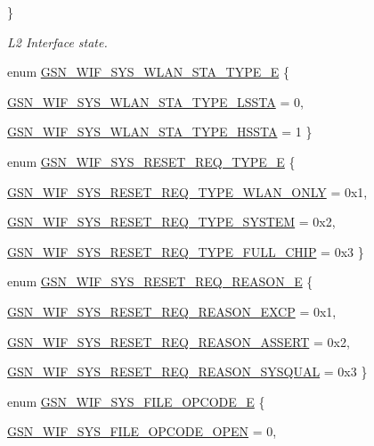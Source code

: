 \begin{DoxyCompactItemize}
 \}
\begin{DoxyCompactList}\small\item\em L2 Interface state. \end{DoxyCompactList}\item 
enum \hyperlink{a00612_a130509bc0cea8325a8be3adb5d7f4bd8}{GSN\_\-WIF\_\-SYS\_\-WLAN\_\-STA\_\-TYPE\_\-E} \{ \par
\hyperlink{a00612_a130509bc0cea8325a8be3adb5d7f4bd8a5f57577583e62def7a5a70dc0edcb87a}{GSN\_\-WIF\_\-SYS\_\-WLAN\_\-STA\_\-TYPE\_\-LSSTA} =  0, 
\par
\hyperlink{a00612_a130509bc0cea8325a8be3adb5d7f4bd8a79509557fc53ad3a04a7294c6457073d}{GSN\_\-WIF\_\-SYS\_\-WLAN\_\-STA\_\-TYPE\_\-HSSTA} =  1
 \}
\item 
enum \hyperlink{a00612_a6412fcc10baf67871043051f04fb42d4}{GSN\_\-WIF\_\-SYS\_\-RESET\_\-REQ\_\-TYPE\_\-E} \{ \par
\hyperlink{a00612_a6412fcc10baf67871043051f04fb42d4aa14896d2f4ebe90e88f8965a0daf7378}{GSN\_\-WIF\_\-SYS\_\-RESET\_\-REQ\_\-TYPE\_\-WLAN\_\-ONLY} =  0x1, 
\par
\hyperlink{a00612_a6412fcc10baf67871043051f04fb42d4af045511de8b76a204570370ec0b0f606}{GSN\_\-WIF\_\-SYS\_\-RESET\_\-REQ\_\-TYPE\_\-SYSTEM} =  0x2, 
\par
\hyperlink{a00612_a6412fcc10baf67871043051f04fb42d4abd8b477460780125b6e3596a2cf2762c}{GSN\_\-WIF\_\-SYS\_\-RESET\_\-REQ\_\-TYPE\_\-FULL\_\-CHIP} =  0x3
 \}
\item 
enum \hyperlink{a00612_aba0b2b7ee12a62ff72fa5ffa83622746}{GSN\_\-WIF\_\-SYS\_\-RESET\_\-REQ\_\-REASON\_\-E} \{ \par
\hyperlink{a00612_aba0b2b7ee12a62ff72fa5ffa83622746ac6a4355cb4d81cc01299fcbd5a23c107}{GSN\_\-WIF\_\-SYS\_\-RESET\_\-REQ\_\-REASON\_\-EXCP} =  0x1, 
\par
\hyperlink{a00612_aba0b2b7ee12a62ff72fa5ffa83622746abef82aaf1f94b754fa8e071bd178c89f}{GSN\_\-WIF\_\-SYS\_\-RESET\_\-REQ\_\-REASON\_\-ASSERT} =  0x2, 
\par
\hyperlink{a00612_aba0b2b7ee12a62ff72fa5ffa83622746a2ddeba9871976fa46984911b026f1e00}{GSN\_\-WIF\_\-SYS\_\-RESET\_\-REQ\_\-REASON\_\-SYSQUAL} =  0x3
 \}
\item 
enum \hyperlink{a00639_ga24ebbde6925db9b03e4648c99be320b4}{GSN\_\-WIF\_\-SYS\_\-FILE\_\-OPCODE\_\-E} \{ \par
\hyperlink{a00639_gga24ebbde6925db9b03e4648c99be320b4a9297e545d68f2bbfb23886d76258954d}{GSN\_\-WIF\_\-SYS\_\-FILE\_\-OPCODE\_\-OPEN} =  0, 
\par

\end{DoxyCompactItemize}
